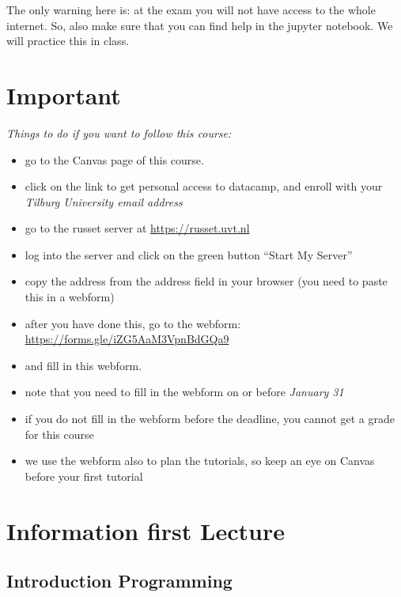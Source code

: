 \documentclass[]{book}
\providecommand{\tightlist}{%
  \setlength{\itemsep}{0pt}\setlength{\parskip}{0pt}}
\begin{document}
The only warning here is: at the exam you will not have access to the whole internet. So, also make sure that you can find help in the jupyter notebook. We will practice this in class.

\hypertarget{important-1}{%
\chapter{Important}\label{important-1}}

\emph{Things to do if you want to follow this course:}

\begin{itemize}
\tightlist
\item
  go to the Canvas page of this course.
\item
  click on the link to get personal access to datacamp, and enroll with your \emph{Tilburg University email address}
\item
  go to the russet server at \url{https://russet.uvt.nl}
\item
  log into the server and click on the green button ``Start My Server''
\item
  copy the address from the address field in your browser (you need to paste this in a webform)
\item
  after you have done this, go to the webform: \url{https://forms.gle/iZG5AaM3VpnBdGQa9}
\item
  and fill in this webform.
\item
  note that you need to fill in the webform on or before \emph{January 31}
\item
  if you do not fill in the webform before the deadline, you cannot get a grade for this course
\item
  we use the webform also to plan the tutorials, so keep an eye on Canvas before your first tutorial
\end{itemize}

\hypertarget{information-first-lecture}{%
\chapter{Information first Lecture}\label{information-first-lecture}}

\hypertarget{introduction-programming}{%
\section{Introduction Programming}\label{introduction-programming}}
\end{document}
